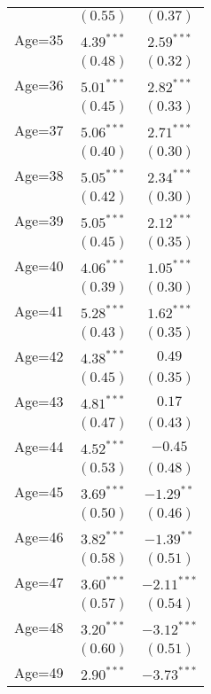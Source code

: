 \documentclass[fullpage]{paper}
\begin{document}
\begin{center}
\begin{longtable}{l c c }
            & $(0.55)$      & $(0.37)$      \\
Age=35      & $4.39^{***}$  & $2.59^{***}$  \\
            & $(0.48)$      & $(0.32)$      \\
Age=36      & $5.01^{***}$  & $2.82^{***}$  \\
            & $(0.45)$      & $(0.33)$      \\
Age=37      & $5.06^{***}$  & $2.71^{***}$  \\
            & $(0.40)$      & $(0.30)$      \\
Age=38      & $5.05^{***}$  & $2.34^{***}$  \\
            & $(0.42)$      & $(0.30)$      \\
Age=39      & $5.05^{***}$  & $2.12^{***}$  \\
            & $(0.45)$      & $(0.35)$      \\
Age=40      & $4.06^{***}$  & $1.05^{***}$  \\
            & $(0.39)$      & $(0.30)$      \\
Age=41      & $5.28^{***}$  & $1.62^{***}$  \\
            & $(0.43)$      & $(0.35)$      \\
Age=42      & $4.38^{***}$  & $0.49$        \\
            & $(0.45)$      & $(0.35)$      \\
Age=43      & $4.81^{***}$  & $0.17$        \\
            & $(0.47)$      & $(0.43)$      \\
Age=44      & $4.52^{***}$  & $-0.45$       \\
            & $(0.53)$      & $(0.48)$      \\
Age=45      & $3.69^{***}$  & $-1.29^{**}$  \\
            & $(0.50)$      & $(0.46)$      \\
Age=46      & $3.82^{***}$  & $-1.39^{**}$  \\
            & $(0.58)$      & $(0.51)$      \\
Age=47      & $3.60^{***}$  & $-2.11^{***}$ \\
            & $(0.57)$      & $(0.54)$      \\
Age=48      & $3.20^{***}$  & $-3.12^{***}$ \\
            & $(0.60)$      & $(0.51)$      \\
Age=49      & $2.90^{***}$  & $-3.73^{***}$ \\

\end{longtable}
\end{center}
\end{document}
